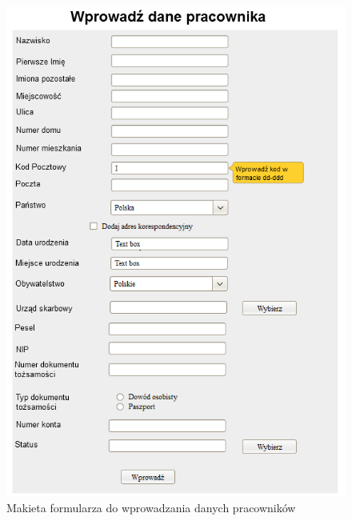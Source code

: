 \begin{figure}[tdh]
    \begin{center}
	\includegraphics[scale=.8 ]{img/makieta.png}
	\caption{Makieta formularza do wprowadzania danych pracowników}
	\label{makieta}
    \end{center}
\end{figure}
